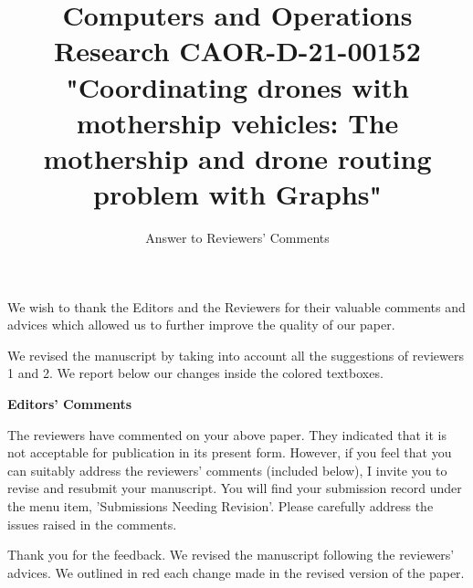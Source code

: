 \documentclass{article}
\title{Computers and Operations Research CAOR-D-21-00152
\\
"Coordinating drones with mothership vehicles: The mothership and drone routing problem with Graphs"}
\author{Answer to Reviewers' Comments}
\newcommand{\initresponses}{\newcounter{pointcounter}}
\begin{document}
\maketitle

We wish to thank the Editors and the Reviewers for their valuable comments and advices which allowed us to further improve the quality of our paper.

We revised the manuscript by taking into account all the suggestions of reviewers 1 and 2. We report below our changes inside the colored textboxes.
 
\initresponses


\begin{tcolorbox}[breakable,enhanced,coltitle=black,colback=yellow!75!white,colframe=yellow!75!white,borderline={1pt}{0pt}{black},boxrule=0pt]
\textbf{Editors' Comments}

The reviewers have commented on your above paper. They indicated that it is not acceptable for publication in its present form.
However, if you feel that you can suitably address the reviewers' comments (included below), I invite you to revise and resubmit your manuscript. You will find your submission record under the menu item, 'Submissions Needing Revision'.
Please carefully address the issues raised in the comments. 

\end{tcolorbox}

\begin{itshape}
\end{itshape}

\begin{tcolorbox}[breakable,enhanced,coltitle=black,colback=yellow!5!white,colframe=yellow!75!white,title=\textbf{Answer E},borderline={1pt}{0pt}{black},boxrule=0pt]
Thank you for the feedback. We revised the manuscript following the reviewers' advices. 
We outlined in red each change made in the revised version of the paper.
\end{tcolorbox}
\end{document}
